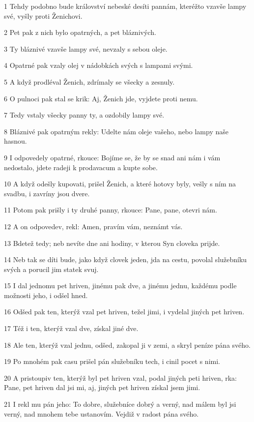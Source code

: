 \par 1 Tehdy podobno bude království nebeské desíti pannám, kteréžto vzavše lampy své, vyšly proti Ženichovi.
\par 2 Pet pak z nich bylo opatrných, a pet bláznivých.
\par 3 Ty bláznivé vzavše lampy své, nevzaly s sebou oleje.
\par 4 Opatrné pak vzaly olej v nádobkách svých s lampami svými.
\par 5 A když prodléval Ženich, zdrímaly se všecky a zesnuly.
\par 6 O pulnoci pak stal se krik: Aj, Ženich jde, vyjdete proti nemu.
\par 7 Tedy vstaly všecky panny ty, a ozdobily lampy své.
\par 8 Bláznivé pak opatrným rekly: Udelte nám oleje vašeho, nebo lampy naše hasnou.
\par 9 I odpovedely opatrné, rkouce: Bojíme se, že by se snad ani nám i vám nedostalo, jdete radeji k prodavacum a kupte sobe.
\par 10 A když odešly kupovati, prišel Ženich, a které hotovy byly, vešly s ním na svadbu, i zavríny jsou dvere.
\par 11 Potom pak prišly i ty druhé panny, rkouce: Pane, pane, otevri nám.
\par 12 A on odpovedev, rekl: Amen, pravím vám, neznámt vás.
\par 13 Bdetež tedy; neb nevíte dne ani hodiny, v kterou Syn cloveka prijde.
\par 14 Neb tak se díti bude, jako když clovek jeden, jda na cestu, povolal služebníku svých a porucil jim statek svuj.
\par 15 I dal jednomu pet hriven, jinému pak dve, a jinému jednu, každému podle možnosti jeho, i odšel hned.
\par 16 Odšed pak ten, kterýž vzal pet hriven, težel jimi, i vydelal jiných pet hriven.
\par 17 Též i ten, kterýž vzal dve, získal jiné dve.
\par 18 Ale ten, kterýž vzal jednu, odšed, zakopal ji v zemi, a skryl peníze pána svého.
\par 19 Po mnohém pak casu prišel pán služebníku tech, i cinil pocet s nimi.
\par 20 A pristoupiv ten, kterýž byl pet hriven vzal, podal jiných peti hriven, rka: Pane, pet hriven dal jsi mi, aj, jiných pet hriven získal jsem jimi.
\par 21 I rekl mu pán jeho: To dobre, služebníce dobrý a verný, nad málem byl jsi verný, nad mnohem tebe ustanovím. Vejdiž v radost pána svého.

